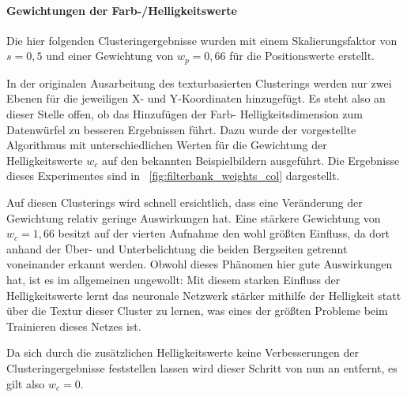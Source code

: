 \paragraph{Gewichtungen der Farb-/Helligkeitswerte}
Die hier folgenden Clusteringergebnisse wurden mit einem Skalierungsfaktor von $s=0,5$ und einer Gewichtung von $w_p=0,66$ für die Positionswerte erstellt.

In der originalen Ausarbeitung des texturbasierten Clusterings \cite{jain_91} werden nur zwei Ebenen für die jeweiligen X- und Y-Koordinaten hinzugefügt. Es steht also an dieser Stelle offen, ob das Hinzufügen der Farb- \bzw Helligkeitsdimension zum Datenwürfel zu besseren Ergebnissen führt. Dazu wurde der vorgestellte Algorithmus mit unterschiedlichen Werten für die Gewichtung der Helligkeitswerte $w_c$ auf den bekannten Beispielbildern ausgeführt. Die Ergebnisse dieses Experimentes sind in \figurename~\ref{fig:filterbank_weights_col} dargestellt.

Auf diesen Clusterings wird schnell ersichtlich, dass eine Veränderung der Gewichtung relativ geringe Auswirkungen hat. Eine stärkere Gewichtung von $w_c=1,66$ besitzt auf der vierten Aufnahme den wohl größten Einfluss, da dort anhand der Über- und Unterbelichtung die beiden Bergseiten getrennt voneinander erkannt werden. Obwohl dieses Phänomen hier gute Auswirkungen hat, ist es im allgemeinen ungewollt: Mit diesem starken Einfluss der Helligkeitswerte lernt das neuronale Netzwerk stärker mithilfe der Helligkeit statt über die Textur dieser Cluster zu lernen, was eines der größten Probleme beim Trainieren dieses Netzes ist.

Da sich durch die zusätzlichen Helligkeitswerte keine Verbesserungen der Clusteringergebnisse feststellen lassen wird dieser Schritt von nun an entfernt, es gilt also $w_c=0$.

